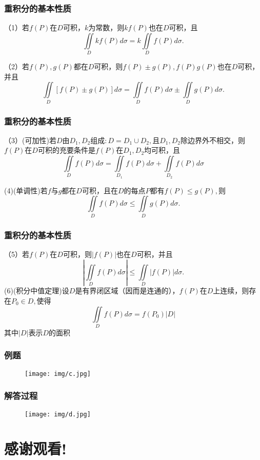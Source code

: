 \documentclass[xetex]{beamer}
\begin{document}
\begin{frame}
    \frametitle{重积分的基本性质}
    （1）若$f(P)$在$D$可积，$k$为常数，则$kf(P)$也在$D$可积，且
    $$\iint\limits_Dkf(P)d\sigma = k\iint\limits_Df(P)d\sigma.$$
    
    （2）若$f(P),g(P)$都在$D$可积，则$f(P) \pm g(P),f(P)g(P)$也在$D$可积，并且
    $$\iint\limits_D[f(P) \pm g(P)]d\sigma=\iint\limits_Df(P)d\sigma \pm \iint\limits_Dg(P)d\sigma.$$
\end{frame}

\begin{frame}
    \frametitle{重积分的基本性质}
    （3）(可加性)若$D$由$D_1,D_2$组成$:D = D_1 \cup D_2,$且$D_1,D_2$除边界外不相交，则$f(P)$在$D$可积的充要条件是$f(P)$在$D_1,D_2$均可积，且
    $$\iint\limits_Df(P)d\sigma = \iint\limits_{D_1}f(P)d\sigma + \iint\limits_{D_2}f(P)d\sigma$$
    
    (4)(单调性)若$f$与$g$都在$D$可积，且在$D$的每点$P$都有$f(P) \leq g(P),$则
    $$\iint\limits_Df(P)d\sigma\leq\iint\limits_Dg(P)d\sigma.$$
\end{frame}

\begin{frame}
    \frametitle{重积分的基本性质}
    （5）若$f(P)$在$D$可积，则$|f(P)|$也在$D$可积，并且
    $$| \iint \limits_Df(P)d \sigma | \leq \iint \limits_D|f(P)|d \sigma.$$
    (6)(积分中值定理)设$D$是有界闭区域（因而是连通的），$f(P)$在$D$上连续，则存在$P_0 \in D,$使得
    $$\iint\limits_Df(P)d\sigma=f(P_0)|D|$$
    其中$|D|$表示$D$的面积
\end{frame}

\begin{frame}
    \frametitle{例题}
    \begin{figure}[ht]
        \centering %
       \texttt{[image: img/c.jpg]}
    \end{figure}
\end{frame}

\begin{frame}
    \frametitle{解答过程}
    \begin{figure}[ht]
        \centering %
       \texttt{[image: img/d.jpg]}
    \end{figure}
\end{frame}

\section{感谢观看!}
\end{document}
